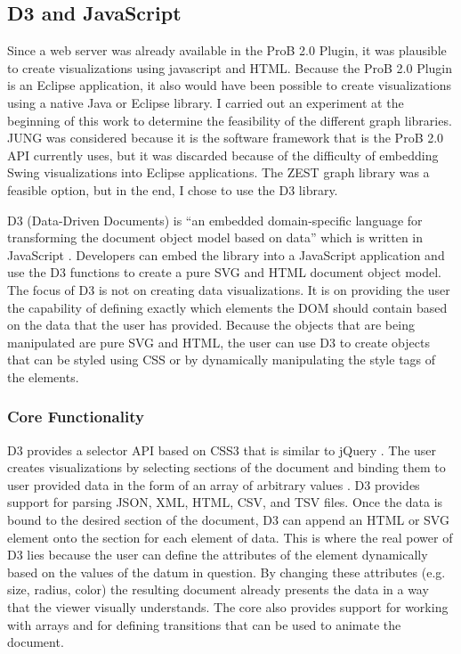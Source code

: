 \subsection{D3 and JavaScript}

Since a web server was already available in the ProB 2.0 Plugin, it was plausible to create visualizations using javascript and HTML. Because the ProB 2.0 Plugin is an Eclipse application, it also would have been possible to create visualizations using a native Java or Eclipse library. I carried out an experiment at the beginning of this work to determine the feasibility of the different graph libraries. JUNG was considered because it is the software framework that is the ProB 2.0 API currently uses, but it was discarded because of the difficulty of embedding Swing visualizations into Eclipse applications. The ZEST graph library was a feasible option, but in the end, I chose to use the D3 library. 

D3 (Data-Driven Documents) is ``an embedded domain-specific language for transforming
the document object model based on data'' which is written in JavaScript \cite{2011-d3}. Developers can embed the library into a JavaScript application and use the D3 functions to create a pure SVG and HTML document object model. The focus of D3 is not on creating data visualizations. It is on providing the user the capability of defining exactly which elements the DOM should contain based on the data that the user has provided. Because the objects that are being manipulated are pure SVG and HTML, the user can use D3 to create objects that can be styled using CSS or by dynamically manipulating the style tags of the elements.

\subsubsection{Core Functionality}

D3 provides a selector API based on CSS3 that is similar to jQuery \cite{jQuery}. The user creates visualizations by selecting sections of the document and binding them to user provided data in the form of an array of arbitrary values \cite{2011-d3}. D3 provides support for parsing JSON, XML, HTML, CSV, and TSV files. Once the data is bound to the desired section of the document, D3 can append an HTML or SVG element onto the section for each element of data. This is where the real power of D3 lies because the user can define the attributes of the element dynamically based on the values of the datum in question. By changing these attributes (e.g. size, radius, color) the resulting document already presents the data in a way that the viewer visually understands. The core also provides support for working with arrays and for defining transitions that can be used to animate the document.

